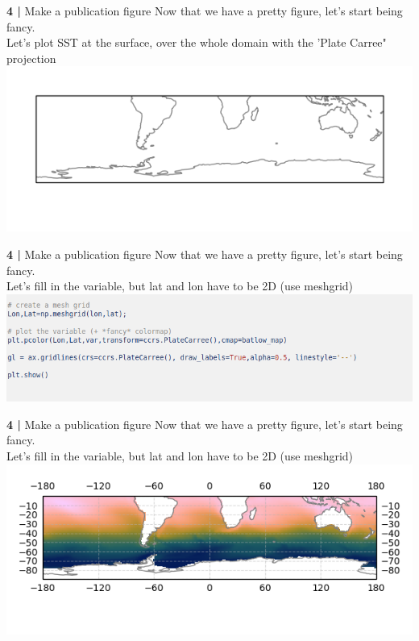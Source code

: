   
\begin{frame}{\textbf{4 |} Make a publication figure} 
    Now that we have a pretty figure, let's start being fancy.\\
        \vspace{0.5cm}
    Let's plot SST at the surface, over the whole domain with the 'Plate Carree" projection
    \includegraphics[scale=0.35]{images/script2_fig1.png}
\end{frame}


\begin{frame}{\textbf{4 |} Make a publication figure} 
    Now that we have a pretty figure, let's start being fancy.\\
        \vspace{0.5cm}
    Let's fill in the variable, but lat and lon have to be  2D (use meshgrid)
    \includegraphics[scale=0.35]{images/Script2_step2.png}
\end{frame}


\begin{frame}{\textbf{4 |} Make a publication figure} 
    Now that we have a pretty figure, let's start being fancy.\\
        \vspace{0.5cm}
    Let's fill in the variable, but lat and lon have to be 2D (use meshgrid)
    \includegraphics[scale=0.45]{images/script2_fig2.png}
\end{frame}
 
